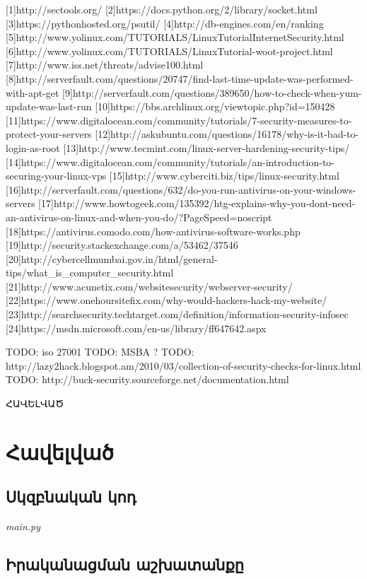 \documentclass[11pt]{article}
\begin{document}
\begin{sloppypar}
[1]http://sectools.org/
[2]https://docs.python.org/2/library/socket.html
[3]https://pythonhosted.org/psutil/
[4]http://db-engines.com/en/ranking
[5]http://www.yolinux.com/TUTORIALS/LinuxTutorialInternetSecurity.html
[6]http://www.yolinux.com/TUTORIALS/LinuxTutorial-woot-project.html
[7]http://www.iss.net/threats/advise100.html
[8]http://serverfault.com/questions/20747/find-last-time-update-was-performed-with-apt-get
[9]http://serverfault.com/questions/389650/how-to-check-when-yum-update-was-last-run
[10]https://bbs.archlinux.org/viewtopic.php?id=150428
[11]https://www.digitalocean.com/community/tutorials/7-security-measures-to-protect-your-servers
[12]http://askubuntu.com/questions/16178/why-is-it-bad-to-login-as-root
[13]http://www.tecmint.com/linux-server-hardening-security-tips/
[14]https://www.digitalocean.com/community/tutorials/an-introduction-to-securing-your-linux-vps
[15]http://www.cyberciti.biz/tips/linux-security.html
[16]http://serverfault.com/questions/632/do-you-run-antivirus-on-your-windows-servers
[17]http://www.howtogeek.com/135392/htg-explains-why-you-dont-need-an-antivirus-on-linux-and-when-you-do/?PageSpeed=noscript
[18]https://antivirus.comodo.com/how-antivirus-software-works.php
[19]http://security.stackexchange.com/a/53462/37546
[20]http://cybercellmumbai.gov.in/html/general-tips/what_is_computer_security.html
[21]http://www.acunetix.com/websitesecurity/webserver-security/
[22]https://www.onehoursitefix.com/why-would-hackers-hack-my-website/
[23]http://searchsecurity.techtarget.com/definition/information-security-infosec
[24]https://msdn.microsoft.com/en-us/library/ff647642.aspx

TODO: iso 27001
TODO: MSBA ?
TODO: http://lazy2hack.blogspot.am/2010/03/collection-of-security-checks-for-linux.html
TODO: http://buck-security.sourceforge.net/documentation.html




\newpage
{}
\vspace*{\fill}
\begingroup
\centering
\centerline{\Huge{ՀԱՎԵԼՎԱԾ}}
\endgroup
\vspace*{\fill}
\newpage

\section*{Հավելված}
\subsection*{Սկզբնական կոդ}

\textit{main.py}


\newpage
\subsection*{Իրականացման աշխատանքը}

\end{sloppypar}
\end{document}
